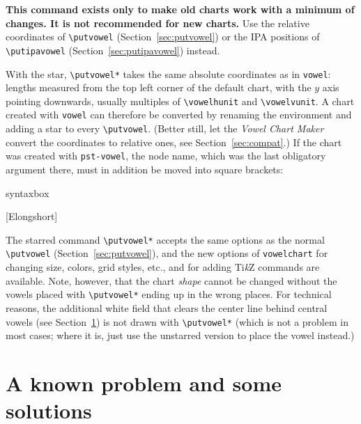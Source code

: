 \documentclass[a4paper,11pt]{article}
\newcommand\cmd[1]{\texttt{\textbackslash #1}}
\newcommand\pkg[1]{\texttt{#1}}
\begin{document}
\noindent
\textbf{This command exists only to make old charts work with a minimum of changes. It is not recommended for new charts.} Use the relative coordinates of \cmd{putvowel} (Section~\ref{sec:putvowel}) or the IPA positions of \cmd{putipavowel} (Section~\ref{sec:putipavowel}) instead.

With the star, \cmd{putvowel*} takes the same absolute coordinates as in \pkg{vowel}: lengths measured from the top left corner of the default chart, with the $y$ axis pointing downwards, usually multiples of \cmd{vowelhunit} and \cmd{vowelvunit}. A chart created with \pkg{vowel} can therefore be converted by renaming the environment and adding a star to every \cmd{putvowel}. (Better still, let the \textit{Vowel Chart Maker} convert the coordinates to relative ones, see Section~\ref{sec:compat}.) If the chart was created with \pkg{pst-vowel}, the node name, which was the last obligatory argument there, must in addition be moved into square brackets:

\begin{tcblisting}{syntaxbox}

[Elongshort]
\end{tcblisting}

\noindent
The starred command \cmd{putvowel*} accepts the same options as the normal \cmd{putvowel} (Section~\ref{sec:putvowel}), and the new options of \pkg{vowelchart} for changing size, colors, grid styles, etc., and for adding Ti\textit{k}Z commands are available.
Note, however, that the chart \textit{shape} cannot be changed without the vowels placed with \cmd{putvowel*} ending up in the wrong places.
For technical reasons, the additional white field that clears the center line behind central vowels (see Section~\ref{sec:issue}) is not drawn with \cmd{putvowel*} (which is not a problem in most cases; where it is, just use the unstarred version to place the vowel instead.)





\section{A known problem and some solutions} \label{sec:issue}
\end{document}
